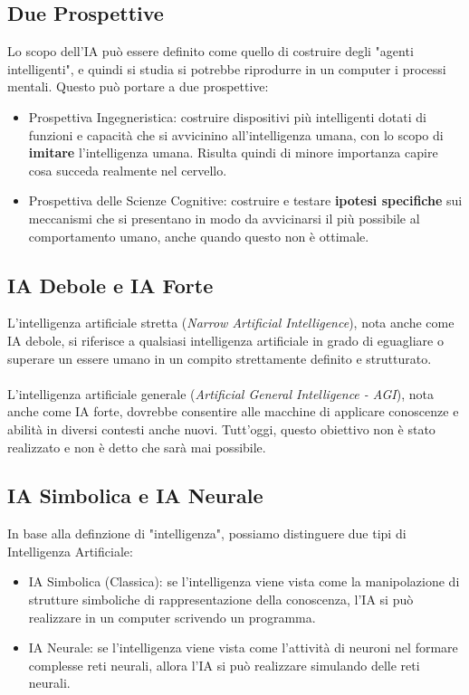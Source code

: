 \documentclass[12pt, a4paper]{article}
\begin{document}
\subsection{Due Prospettive}
Lo scopo dell'IA può essere definito come quello di costruire degli "agenti intelligenti", e quindi si studia si potrebbe riprodurre in un computer i processi mentali. Questo può portare a due prospettive:
\begin{itemize}
    \item Prospettiva Ingegneristica: costruire dispositivi più intelligenti dotati di funzioni e capacità che si avvicinino all'intelligenza umana, con lo scopo di \textbf{imitare} l'intelligenza umana. Risulta quindi di minore importanza capire cosa succeda realmente nel cervello.
    \item Prospettiva delle Scienze Cognitive: costruire e testare \textbf{ipotesi specifiche} sui meccanismi che si presentano in modo da avvicinarsi il più possibile al comportamento umano, anche quando questo non è ottimale.
\end{itemize}

\subsection{IA Debole e IA Forte}
L'intelligenza artificiale stretta (\textit{Narrow Artificial Intelligence}), nota anche come IA debole, si riferisce a qualsiasi intelligenza artificiale in grado di eguagliare o superare un essere umano in un compito strettamente definito e strutturato.\\\\
L'intelligenza artificiale generale (\textit{Artificial General Intelligence - AGI}), nota anche come IA forte, dovrebbe consentire alle macchine di applicare conoscenze e abilità in diversi contesti anche nuovi. Tutt'oggi, questo obiettivo non è stato realizzato e non è detto che sarà mai possibile.

\subsection{IA Simbolica e IA Neurale}
In base alla definzione di "intelligenza", possiamo distinguere due tipi di Intelligenza Artificiale:
\begin{itemize}
    \item IA Simbolica (Classica): se l'intelligenza viene vista come la manipolazione di strutture simboliche di rappresentazione della conoscenza, l'IA  si può realizzare in un computer scrivendo un programma.
    \item IA Neurale: se l'intelligenza viene vista come l'attività di neuroni nel formare complesse reti neurali, allora l'IA si può realizzare simulando delle reti neurali.
\end{itemize}
\end{document}
